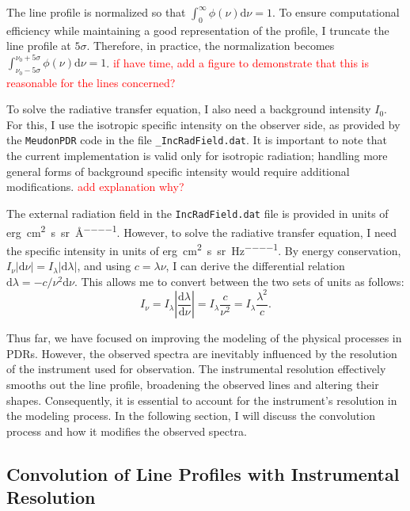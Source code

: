 \documentclass[12pt,a4paper]{article}
\newcommand{\dd}[1]{\mathrm{d}#1}
\newcommand{\mdpdr}{\texttt{MeudonPDR} code}
\newcommand{\qt}[1]{\textcolor{red}{#1}}
\begin{document}
The line profile is normalized so that $\int_0^{\infty} \phi(\nu) \dd{\nu} = 1$. To ensure computational efficiency while maintaining a good representation of the profile, I truncate the line profile at $5\sigma$. Therefore, in practice, the normalization becomes $\int_{\nu_0 - 5\sigma}^{\nu_0 + 5\sigma}\phi(\nu) \dd{\nu} = 1$.
\qt{if have time, add a figure to demonstrate that this is reasonable for the lines concerned?}

To solve the radiative transfer equation, I also need a background intensity $I_0$. For this, I use the isotropic specific intensity on the observer side, as provided by the \mdpdr{} in the file \texttt{_IncRadField.dat}. It is important to note that the current implementation is valid only for isotropic radiation; handling more general forms of background specific intensity would require additional modifications. \qt{add explanation why?}

The external radiation field in the \texttt{IncRadField.dat} file is provided in units of \unit{erg\per\centi\meter\squared\per\second\per\steradian\per\AA}. However, to solve the radiative transfer equation, I need the specific intensity in units of \unit{erg\per\centi\meter\squared\per\second\per\steradian\per\Hz}. By energy conservation, $I_\nu |\dd{\nu}| = I_\lambda |\dd{\lambda}|$, and using $c = \lambda\nu$, I can derive the differential relation $\dd{\lambda} = -c/\nu^2 \dd{\nu}$. This allows me to convert between the two sets of units as follows:
\begin{equation}
    I_\nu = I_\lambda \left|\frac{\dd{\lambda}}{\dd{\nu}}\right| = I_\lambda \frac{c}{\nu^2} = I_\lambda \frac{\lambda^2}{c}.
\end{equation}

Thus far, we have focused on improving the modeling of the physical processes in PDRs. However, the observed spectra are inevitably influenced by the resolution of the instrument used for observation. The instrumental resolution effectively smooths out the line profile, broadening the observed lines and altering their shapes. Consequently, it is essential to account for the instrument's resolution in the modeling process. In the following section, I will discuss the convolution process and how it modifies the observed spectra.

\subsection{Convolution of Line Profiles with Instrumental Resolution} \label{sec:convolution}
\end{document}
